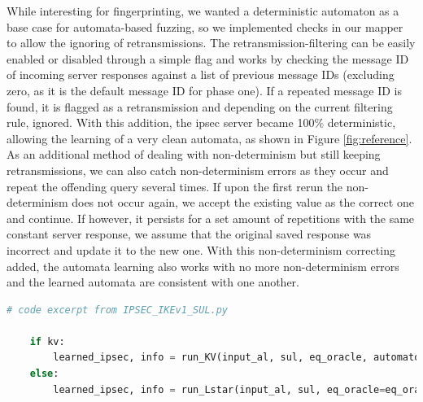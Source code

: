 While interesting for fingerprinting, we wanted a deterministic automaton as a base case for automata-based fuzzing, so we implemented checks in our mapper to allow the ignoring of retransmissions. The retransmission-filtering can be easily enabled or disabled through a simple flag and works by checking the message ID of incoming server responses against a list of previous message IDs (excluding zero, as it is the default message ID for phase one). If a repeated message ID is found, it is flagged as a retransmission and depending on the current filtering rule, ignored. With this addition, the \ac{ipsec} server became 100\% deterministic, allowing the learning of a very clean automata, as shown in Figure \ref{fig:reference}. As an additional method of dealing with non-determinism but still keeping retransmissions, we can also catch non-determinism errors as they occur and repeat the offending query several times. If upon the first rerun the non-determinism does not occur again, we accept the existing value as the correct one and continue. If however, it persists for a set amount of repetitions with the same constant server response, we assume that the original saved response was incorrect and update it to the new one. With this non-determinism correcting added, the automata learning also works with no more non-determinism errors and the learned automata are consistent with one another.


\begin{lstlisting}[float=ht, caption=Switching Learning Algorithms, label=lst:newalg, language=python]
	# code excerpt from IPSEC_IKEv1_SUL.py
	
	if kv:
		learned_ipsec, info = run_KV(input_al, sul, eq_oracle, automaton_type='mealy', cex_processing='rs')
	else:
		learned_ipsec, info = run_Lstar(input_al, sul, eq_oracle=eq_oracle, automaton_type='mealy', cache_and_non_det_check=True)
\end{lstlisting}
